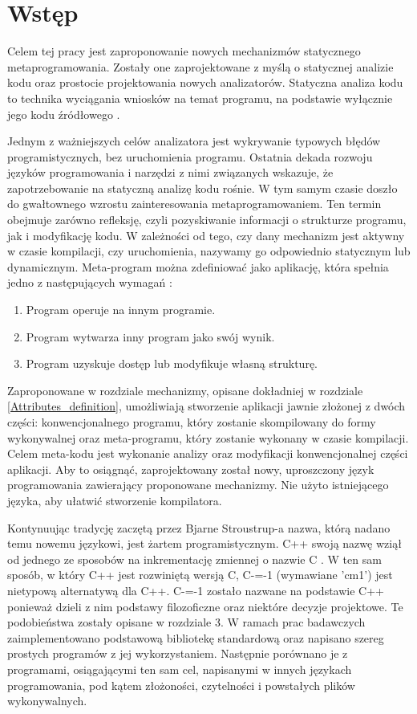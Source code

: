 \section{Wstęp}
Celem tej pracy jest zaproponowanie nowych mechanizmów statycznego 
metaprogramowania.
Zostały one zaprojektowane z myślą o statycznej analizie kodu oraz prostocie projektowania nowych analizatorów.
Statyczna analiza kodu to technika wyciągania wniosków na temat programu, na podstawie wyłącznie jego kodu źródłowego \cite{survey_of_metaprograming}.

Jednym z ważniejszych celów analizatora jest wykrywanie typowych błędów programistycznych, bez uruchomienia programu.
Ostatnia dekada rozwoju języków programowania i narzędzi z nimi związanych wskazuje, że zapotrzebowanie na statyczną analizę kodu rośnie.
W tym samym czasie doszło do gwałtownego wzrostu zainteresowania metaprogramowaniem. Ten termin obejmuje zarówno refleksję, czyli pozyskiwanie informacji o strukturze programu, jak i modyfikację kodu. W zależności od tego, czy dany mechanizm jest aktywny w czasie kompilacji, czy uruchomienia, nazywamy go odpowiednio statycznym lub dynamicznym.
Meta-program można zdefiniować jako aplikację, która spełnia jedno z następujących wymagań \cite{nielson2004principles}:
\begin{enumerate}
\item Program operuje na innym programie.
\item Program wytwarza inny program jako swój wynik.
\item Program uzyskuje dostęp lub modyfikuje własną strukturę.
\end{enumerate}

Zaproponowane w rozdziale mechanizmy, opisane dokładniej w rozdziale \ref{Attributes_definition}, umożliwiają stworzenie aplikacji jawnie złożonej z dwóch części:
konwencjonalnego programu, który zostanie skompilowany do formy wykonywalnej oraz meta-programu, który zostanie wykonany w czasie kompilacji.
Celem meta-kodu jest wykonanie analizy oraz modyfikacji konwencjonalnej części aplikacji.
Aby to osiągnąć, zaprojektowany został nowy, uproszczony język programowania zawierający proponowane mechanizmy.
Nie użyto istniejącego języka, aby ułatwić stworzenie kompilatora.

Kontynuując tradycję zaczętą przez Bjarne Stroustrup-a nazwa, którą nadano temu nowemu językowi, jest żartem programistycznym. C++ swoją nazwę wziął od jednego ze sposobów na inkrementację zmiennej o nazwie C \cite{stroustrup_com}. 
W ten sam sposób, w który C++ jest rozwiniętą wersją C, C-=-1 (wymawiane 'cm1') jest nietypową alternatywą dla C++. C-=-1 zostało nazwane na podstawie C++ ponieważ dzieli z nim podstawy filozoficzne oraz niektóre decyzje projektowe. Te podobieństwa zostały opisane w rozdziale 3.
W ramach prac badawczych zaimplementowano podstawową bibliotekę standardową oraz napisano szereg prostych programów z jej wykorzystaniem. Następnie porównano je z programami, osiągającymi ten sam cel, napisanymi w innych językach programowania, pod kątem złożoności, czytelności i powstałych plików wykonywalnych.

